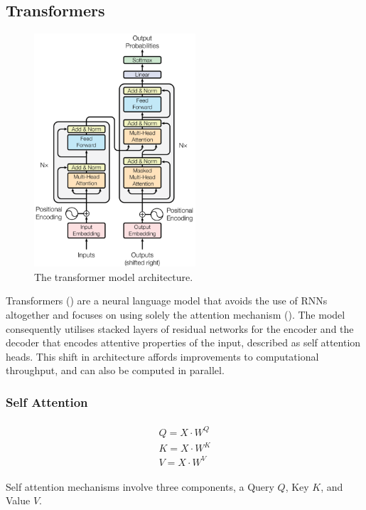 \documentclass[12pt,twoside]{report}
\begin{document}
\subsection{Transformers}

\begin{figure}[!ht]
      
	\centering
	\includegraphics[width=60mm]{diagrams/transformers.png}
	\caption{The transformer model architecture.\cite{vaswani_attention_2017} \label{transformer}}
  \end{figure}

Transformers (\cite{vaswani_attention_2017}) are a neural language model that avoids the use of RNNs altogether and focuses on using solely the attention mechanism (\cite{bahdanau_neural_2014}). The model consequently  utilises stacked layers of residual networks for the encoder and the decoder that encodes attentive properties of the input, described as self attention heads. This shift in architecture affords improvements to computational throughput, and can also be computed in parallel.

\subsubsection{Self Attention}

\begin{align}
\label{eqn:eqlabel}
\begin{split}
	Q = X \cdot W^Q \\
	K = X \cdot W^K \\
	V = X \cdot W^V 
\end{split}
\end{align}

Self attention mechanisms involve three components, a Query $Q$, Key $K$, and Value $V$. 
\end{document}
